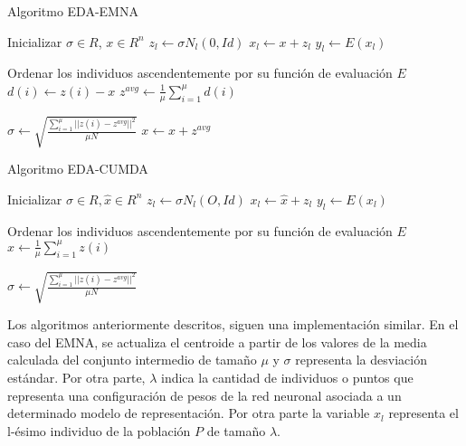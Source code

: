 \begin{algorithm}[H]
	\caption{Algoritmo EDA-EMNA}
	\label{alg1}
	\begin{algorithmic}[1]
		\STATE Inicializar $\sigma \in R$, $x\in R^{n}$
		\STATE $z_{l}\leftarrow \sigma N_{l}(0,Id)$
		\STATE $x_{l}\leftarrow x + z_{l}$
		\STATE $y_{l}\leftarrow E(x_{l})$
		\ENDFOR
		
		\STATE Ordenar los individuos ascendentemente por su función de evaluación $E$
		\STATE $d(i) \leftarrow z(i)-x$
		\STATE $z^{avg}\leftarrow \frac{1}{\mu}\sum_{i=1}^{\mu}d(i)$
		
		\STATE $\sigma \leftarrow \sqrt{\frac{\sum_{i=1}^{\mu}||z(i)-z^{avg}||^{2}}{\mu N}}$
		\STATE $x\leftarrow x+z^{avg}$
		\ENDWHILE
	\end{algorithmic}
\end{algorithm}

\begin{algorithm}[H]
	\caption{Algoritmo EDA-CUMDA}
	\label{alg2}
	\begin{algorithmic}[1]
		\STATE Inicializar $\sigma \in R, \hat{x} \in R^{n}$
		\STATE $z_{l}\leftarrow \sigma N_{l}(O,Id)$
		\STATE $x_{l}\leftarrow \hat{x} + z_{l}$
		\STATE $y_{l}\leftarrow E(x_{l})$
		\ENDFOR
		
		\STATE Ordenar los individuos ascendentemente por su función de evaluación $E$
		\STATE $\hat{x} \leftarrow \frac{1}{\mu}\sum_{i=1}^{\mu}z(i)$
		
		\STATE $\sigma \leftarrow \sqrt{\frac{\sum_{i=1}^{\mu}||z(i)-z^{avg}||^{2}}{\mu N}}$
		
		\ENDWHILE
	\end{algorithmic}
\end{algorithm}

Los algoritmos anteriormente descritos, siguen una implementación similar. En el caso del EMNA, se actualiza el centroide a partir de los valores de la media calculada del conjunto intermedio de tamaño $\mu$ y $\sigma$ representa la desviación estándar. Por otra parte, $\lambda$ indica la cantidad de individuos o puntos que representa una configuración de pesos de la red neuronal asociada a un determinado modelo de representación. Por otra parte la variable $x_{l}$ representa el l-ésimo individuo de la población $P$ de tamaño $\lambda$.

